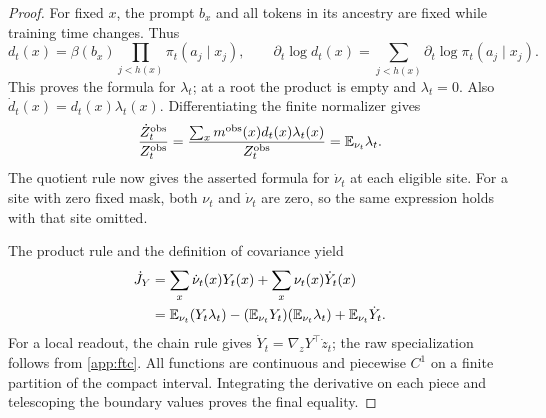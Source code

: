 \begin{proof}
For fixed $x$, the prompt $b_x$ and all tokens in its ancestry are fixed while training time changes. Thus
\[
 d_t(x)=\beta(b_x)\prod_{j<h(x)}\pi_t(a_j\mid x_j),\qquad
 \partial_t\log d_t(x)=\sum_{j<h(x)}\partial_t\log\pi_t(a_j\mid x_j).
\]
This proves the formula for $\lambda_t$; at a root the product is empty and $\lambda_t=0$. Also $\dot d_t(x)=d_t(x)\lambda_t(x)$. Differentiating the finite normalizer gives
\[
 \frac{\dot Z_t^{\rm obs}}{Z_t^{\rm obs}}
 =\frac{\sum_xm^{\rm obs}(x)d_t(x)\lambda_t(x)}{Z_t^{\rm obs}}
 =\mathbb{E}_{\nu_t}\lambda_t.
\]
The quotient rule now gives the asserted formula for $\dot\nu_t$ at each eligible site. For a site with zero fixed mask, both $\nu_t$ and $\dot\nu_t$ are zero, so the same expression holds with that site omitted.

The product rule and the definition of covariance yield
\begin{align*}
 \dot J_Y
 &=\sum_x\dot\nu_t(x)Y_t(x)+\sum_x\nu_t(x)\dot Y_t(x)\\
 &=\mathbb{E}_{\nu_t}(Y_t\lambda_t)
   -(\mathbb{E}_{\nu_t}Y_t)(\mathbb{E}_{\nu_t}\lambda_t)
   +\mathbb{E}_{\nu_t}\dot Y_t.
\end{align*}
For a local readout, the chain rule gives $\dot Y_t=\nabla_zY^\top\dot z_t$; the raw specialization follows from \cref{app:ftc}. All functions are continuous and piecewise $C^1$ on a finite partition of the compact interval. Integrating the derivative on each piece and telescoping the boundary values proves the final equality.
\end{proof}

